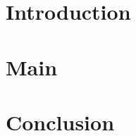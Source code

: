 \documentclass{article}
\begin{document}
\section{Introduction}


\section{Main}


\section{}


\section{Conclusion}

\end{document}
